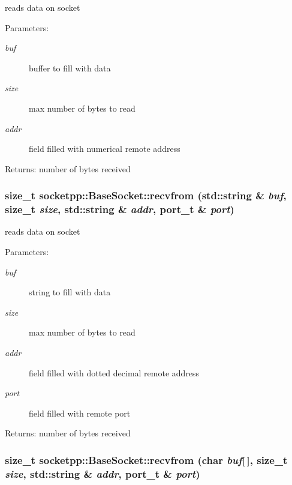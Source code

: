 reads data on socket 

\begin{Desc}
\item[Parameters:]
\begin{description}
\item[{\em buf}]buffer to fill with data \item[{\em size}]max number of bytes to read \item[{\em addr}]field filled with numerical remote address \end{description}
\end{Desc}
\begin{Desc}
\item[Returns:]number of bytes received \end{Desc}
\hypertarget{classsocketpp_1_1BaseSocket_259bb054a2abf0ffadf3c75bce4892b0}{
\subsubsection[{recvfrom}]{\setlength{\rightskip}{0pt plus 5cm}size\_\-t socketpp::BaseSocket::recvfrom (std::string \& {\em buf}, \/  size\_\-t {\em size}, \/  std::string \& {\em addr}, \/  {\bf port\_\-t} \& {\em port})}}
\label{classsocketpp_1_1BaseSocket_259bb054a2abf0ffadf3c75bce4892b0}


reads data on socket 

\begin{Desc}
\item[Parameters:]
\begin{description}
\item[{\em buf}]string to fill with data \item[{\em size}]max number of bytes to read \item[{\em addr}]field filled with dotted decimal remote address \item[{\em port}]field filled with remote port \end{description}
\end{Desc}
\begin{Desc}
\item[Returns:]number of bytes received \end{Desc}
\hypertarget{classsocketpp_1_1BaseSocket_205fc515468a3df01258f7ebd6fdf38c}{
\subsubsection[{recvfrom}]{\setlength{\rightskip}{0pt plus 5cm}size\_\-t socketpp::BaseSocket::recvfrom (char {\em buf}\mbox{[}$\,$\mbox{]}, \/  size\_\-t {\em size}, \/  std::string \& {\em addr}, \/  {\bf port\_\-t} \& {\em port})}}
\label{classsocketpp_1_1BaseSocket_205fc515468a3df01258f7ebd6fdf38c}


